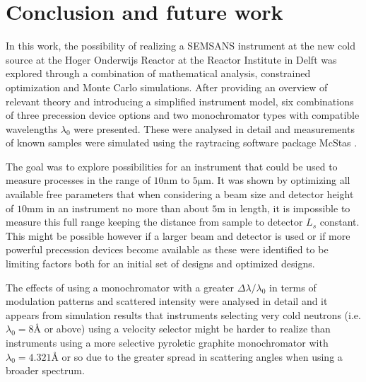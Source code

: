 \documentclass{article}
\begin{document}

\newpage
\section{Conclusion and future work}
In this work, the possibility of realizing a SEMSANS instrument at the new cold source at the Hoger Onderwijs Reactor at the Reactor Institute in Delft was explored through a combination of mathematical analysis, constrained optimization and Monte Carlo simulations. After providing an overview of relevant theory and introducing a simplified instrument model, six combinations of three precession device options and two monochromator types with compatible wavelengths $\lambda_0$ were presented. These were analysed in detail and measurements of known samples were simulated using the raytracing software package McStas \cite{willendrup2020}. 

The goal was to explore possibilities for an instrument that could be used to measure processes in the range of $10 \unit{\nano\meter}$ to $5 \unit{\micro\meter}$. It was shown by optimizing all available free parameters that when considering a beam size and detector height of $10\unit{\milli\meter}$ in an instrument no more than about $5 \unit\meter$ in length, it is impossible to measure this full range keeping the distance from sample to detector $L_s$ constant. This might be possible however if a larger beam and detector is used or if more powerful precession devices become available as these were identified to be limiting factors both for an initial set of designs and optimized designs.

The effects of using a monochromator with a greater $\Delta\lambda/\lambda_0$ in terms of modulation patterns and scattered intensity were analysed in detail and it appears from simulation results that instruments selecting very cold neutrons (i.e. $\lambda_0 = 8$Å or above) using a velocity selector might be harder to realize than instruments using a more selective pyroletic graphite monochromator with  $\lambda_0 = 4.321$Å or so due to the greater spread in scattering angles when using a broader spectrum. 
\end{document}
